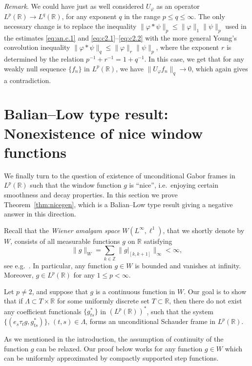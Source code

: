 \documentclass[reqno,a4paper,12pt]{amsart}
\numberwithin{equation}{section}
\numberwithin{figure}{section}
\newcommand\R{\mathbb{R}}
\newcommand\Z{\mathbb{Z}}
\newcommand\Lam{\Lambda}
\newcommand\1{\mathds{1}}
\newcommand{\pphi}{\varphi}
\newcommand{\TTT}{T}
\renewcommand\le{\leqslant}
\newcommand\sbt{\subset}
\theoremstyle{plain}
\newcommand{\thmref}[1]{Theorem~\ref{#1}}
\theoremstyle{definition}
\begin{document}
\emph{Remark}. We could have just as well 
considered $U_\pphi$ as an operator
$L^p(\R) \to L^q(\R)$, for any exponent $q$
in the range  $p \le q \le \infty$. The only
necessary change is to replace the inequality 
$\|\pphi \ast \psi \|_p \le \|\pphi\|_1 \|\psi\|_p$
used in the estimates \eqref{eq:an.c.1} and
\eqref{eq:c2.1}--\eqref{eq:c2.2} 
with the more general Young's convolution inequality 
$\|\pphi \ast \psi \|_q \le \|\pphi\|_r \|\psi\|_p$,
where the exponent $r$ is determined by the relation
$p^{-1} + r^{-1} = 1 + q^{-1}$.
In this case, we get that for any weakly null sequence 
$\{ f_n \}$ in $L^p(\R)$, we have
$\|U_\pphi f_n\|_q \to 0$, which again gives
a contradiction.






\section{Balian--Low type result: Nonexistence of nice window functions}
\label{sec:nicewind}


We finally turn to the question of existence of 
unconditional Gabor frames in $L^p(\R)$ such that
the window function $g$ is  ``nice'', i.e.\ enjoying 
certain smoothness and decay properties. 
In this section we prove \thmref{thm:nicegen},
which is a Balian--Low type result giving a negative answer in this direction.


Recall that the \emph{Wiener amalgam space} $W(L^\infty, \ell^1)$, that
we  shortly denote by $W$, consists of all measurable
functions $g$ on $\R$ satisfying
\begin{equation}
\label{eq:am.def.2}
\|g\|_W =\sum_{k\in\Z} \|g|_{[k,k+1]}\|_{\infty} < \infty,
\end{equation}
see e.g.\ \cite[Section 11.4]{Hei11}.
In particular, any function $g \in W$ is bounded and vanishes at infinity.
Moreover, $g \in L^p(\R)$ for any $1 \le p < \infty$.


Let $p \ne 2$, and suppose that $g$ is a continuous function in $W$.
Our goal is to show that if $\Lam \sbt \TTT \times \R$
for some uniformly discrete set $\TTT\subset \R$, then 
there do not exist any 
coefficient functionals $\{ g^*_{ts} \}$ in $(L^p(\R))^*$,
such that the system $\{(e_s \tau_t g, g^*_{ts})\}$, $(t,s) \in \Lam$, 
forms an unconditional Schauder frame in  $L^p(\R)$.


As we mentioned in the introduction, the assumption of continuity of the function $g$
can be relaxed. Our proof below works for any function $g\in W$
which can be uniformly approximated by compactly supported
step functions.
\end{document}
